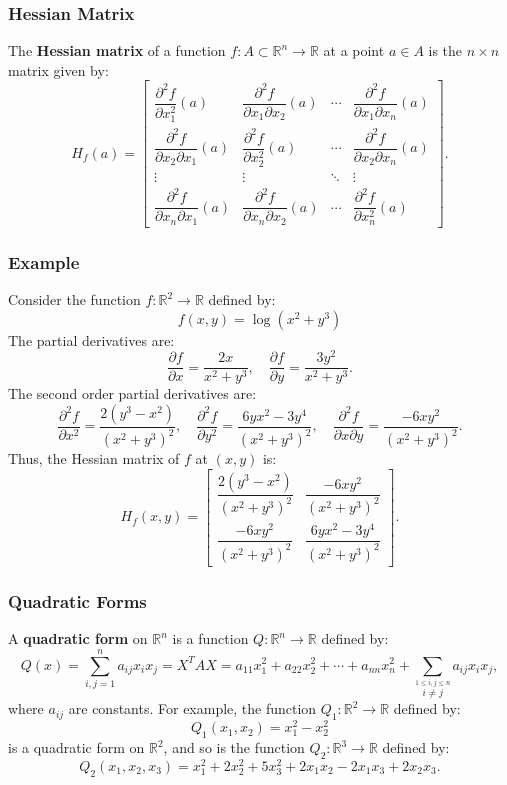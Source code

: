 \documentclass[11pt]{article}
\begin{document}
\subsubsection{Hessian Matrix}
The \textbf{Hessian matrix} of a function \(f : A \subset \mathbb{R}^n \to \mathbb{R}\) at a point \(a \in A\) is the \(n \times n\) matrix given by:
\[H_f(a) = \begin{bmatrix}
\dfrac{\partial^2 f}{\partial x_1^2}(a) & \dfrac{\partial^2 f}{\partial x_1 \partial x_2}(a) & \cdots & \dfrac{\partial^2 f}{\partial x_1 \partial x_n}(a) \\
\dfrac{\partial^2 f}{\partial x_2 \partial x_1}(a) & \dfrac{\partial^2 f}{\partial x_2^2}(a) & \cdots & \dfrac{\partial^2 f}{\partial x_2 \partial x_n}(a) \\
\vdots & \vdots & \ddots & \vdots \\
\dfrac{\partial^2 f}{\partial x_n \partial x_1}(a) & \dfrac{\partial^2 f}{\partial x_n \partial x_2}(a) & \cdots & \dfrac{\partial^2 f}{\partial x_n^2}(a)
\end{bmatrix}.\]

\subsubsection*{Example}
Consider the function \(f : \mathbb{R}^2 \to \mathbb{R}\) defined by:
\[f(x, y) = \log(x^2 + y^3)\]
The partial derivatives are:
\[\frac{\partial f}{\partial x} = \frac{2x}{x^2 + y^3}, \quad \frac{\partial f}{\partial y} = \frac{3y^2}{x^2 + y^3}.\]
The second order partial derivatives are:
\[\frac{\partial^2 f}{\partial x^2} = \frac{2(y^3 - x^2)}{(x^2 + y^3)^2}, \quad \frac{\partial^2 f}{\partial y^2} = \frac{6yx^2 - 3y^4}{(x^2 + y^3)^2}, \quad \frac{\partial^2 f}{\partial x \partial y} = \frac{-6xy^2}{(x^2 + y^3)^2}.\]
Thus, the Hessian matrix of \(f\) at \((x, y)\) is:
\[H_f(x, y) = \begin{bmatrix}
\dfrac{2(y^3 - x^2)}{(x^2 + y^3)^2} & \dfrac{-6xy^2}{(x^2 + y^3)^2} \\
\dfrac{-6xy^2}{(x^2 + y^3)^2} & \dfrac{6yx^2 - 3y^4}{(x^2 + y^3)^2}
\end{bmatrix}.\]

\subsubsection{Quadratic Forms}
A \textbf{quadratic form} on \(\mathbb{R}^n\) is a function \(Q : \mathbb{R}^n \to \mathbb{R}\) defined by:
\[Q(x) = \sum_{i,j=1}^n a_{ij} x_i x_j = X^T A X = a_{11} x_1^2 + a_{22} x_2^2 + \cdots + a_{nn} x_n^2 + \sum_{\stackrel{1 \leq i, j \leq n}{i \neq j}} a_{ij} x_i x_j,\]
where \(a_{ij}\) are constants. For example, the function \(Q_1 : \mathbb{R}^2 \to \mathbb{R}\) defined by:
\[Q_1(x_1, x_2) = x_1^2 - x_2^2\]
is a quadratic form on \(\mathbb{R}^2\), and so is the function \(Q_2 : \mathbb{R}^3 \to \mathbb{R}\) defined by:
\[Q_2(x_1, x_2, x_3) = x_1^2 + 2 x_2^2 + 5 x_3^2 + 2 x_1 x_2 - 2 x_1 x_3 + 2 x_2 x_3.\]
\end{document}
